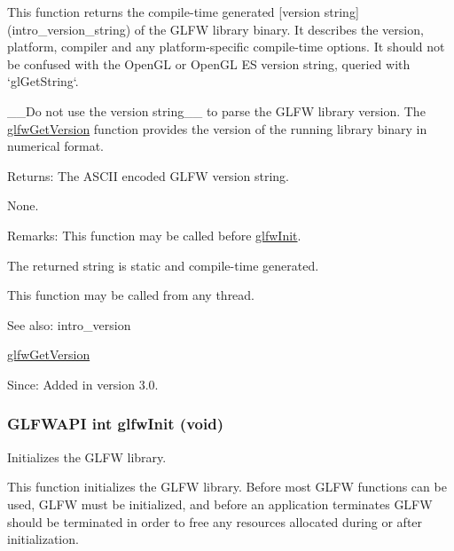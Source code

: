This function returns the compile-time generated \mbox{[}version string\mbox{]}(intro\_\-version\_\-string) of the GLFW library binary. It describes the version, platform, compiler and any platform-specific compile-time options. It should not be confused with the OpenGL or OpenGL ES version string, queried with `glGetString`.

\_\-\_\-Do not use the version string\_\-\_\- to parse the GLFW library version. The \hyperlink{group__init_g2402c7824ac0194c13722790ff9559ff}{glfwGetVersion} function provides the version of the running library binary in numerical format.

\begin{Desc}
\item[Returns:]The ASCII encoded GLFW version string.\end{Desc}
None.

\begin{Desc}
\item[Remarks:]This function may be called before \hyperlink{group__init_gb41771f0215a2e0afb4cf1cf98082d40}{glfwInit}.\end{Desc}
The returned string is static and compile-time generated.

This function may be called from any thread.

\begin{Desc}
\item[See also:]intro\_\-version 

\hyperlink{group__init_g2402c7824ac0194c13722790ff9559ff}{glfwGetVersion}\end{Desc}
\begin{Desc}
\item[Since:]Added in version 3.0. \end{Desc}
\hypertarget{group__init_gb41771f0215a2e0afb4cf1cf98082d40}{
\subsubsection[glfwInit]{\setlength{\rightskip}{0pt plus 5cm}GLFWAPI int glfwInit (void)}}
\label{group__init_gb41771f0215a2e0afb4cf1cf98082d40}


Initializes the GLFW library. 

This function initializes the GLFW library. Before most GLFW functions can be used, GLFW must be initialized, and before an application terminates GLFW should be terminated in order to free any resources allocated during or after initialization.

